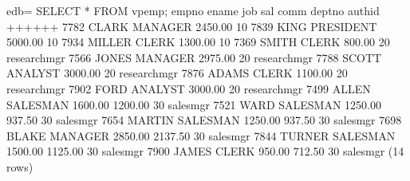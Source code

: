 \documentclass[letterpaper,10pt,english,openany,oneside]{sphinxmanual}
\begin{document}
%
\begin{sphinxVerbatim}[commandchars=\\\{\}]
edb=\PYGZgt{} SELECT * FROM vpemp;
 empno \textbar{} ename  \textbar{}    job    \textbar{}   sal   \textbar{}  comm   \textbar{} deptno \textbar{}   authid
\PYGZhy{}\PYGZhy{}\PYGZhy{}\PYGZhy{}\PYGZhy{}\PYGZhy{}\PYGZhy{}+\PYGZhy{}\PYGZhy{}\PYGZhy{}\PYGZhy{}\PYGZhy{}\PYGZhy{}\PYGZhy{}\PYGZhy{}+\PYGZhy{}\PYGZhy{}\PYGZhy{}\PYGZhy{}\PYGZhy{}\PYGZhy{}\PYGZhy{}\PYGZhy{}\PYGZhy{}\PYGZhy{}\PYGZhy{}+\PYGZhy{}\PYGZhy{}\PYGZhy{}\PYGZhy{}\PYGZhy{}\PYGZhy{}\PYGZhy{}\PYGZhy{}\PYGZhy{}+\PYGZhy{}\PYGZhy{}\PYGZhy{}\PYGZhy{}\PYGZhy{}\PYGZhy{}\PYGZhy{}\PYGZhy{}\PYGZhy{}+\PYGZhy{}\PYGZhy{}\PYGZhy{}\PYGZhy{}\PYGZhy{}\PYGZhy{}\PYGZhy{}\PYGZhy{}+\PYGZhy{}\PYGZhy{}\PYGZhy{}\PYGZhy{}\PYGZhy{}\PYGZhy{}\PYGZhy{}\PYGZhy{}\PYGZhy{}\PYGZhy{}\PYGZhy{}\PYGZhy{}\PYGZhy{}
  7782 \textbar{} CLARK  \textbar{} MANAGER   \textbar{} 2450.00 \textbar{}         \textbar{}     10 \textbar{}
  7839 \textbar{} KING   \textbar{} PRESIDENT \textbar{} 5000.00 \textbar{}         \textbar{}     10 \textbar{}
  7934 \textbar{} MILLER \textbar{} CLERK     \textbar{} 1300.00 \textbar{}         \textbar{}     10 \textbar{}
  7369 \textbar{} SMITH  \textbar{} CLERK     \textbar{}  800.00 \textbar{}         \textbar{}     20 \textbar{} researchmgr
  7566 \textbar{} JONES  \textbar{} MANAGER   \textbar{} 2975.00 \textbar{}         \textbar{}     20 \textbar{} researchmgr
  7788 \textbar{} SCOTT  \textbar{} ANALYST   \textbar{} 3000.00 \textbar{}         \textbar{}     20 \textbar{} researchmgr
  7876 \textbar{} ADAMS  \textbar{} CLERK     \textbar{} 1100.00 \textbar{}         \textbar{}     20 \textbar{} researchmgr
  7902 \textbar{} FORD   \textbar{} ANALYST   \textbar{} 3000.00 \textbar{}         \textbar{}     20 \textbar{} researchmgr
  7499 \textbar{} ALLEN  \textbar{} SALESMAN  \textbar{} 1600.00 \textbar{} 1200.00 \textbar{}     30 \textbar{} salesmgr
  7521 \textbar{} WARD   \textbar{} SALESMAN  \textbar{} 1250.00 \textbar{}  937.50 \textbar{}     30 \textbar{} salesmgr
  7654 \textbar{} MARTIN \textbar{} SALESMAN  \textbar{} 1250.00 \textbar{}  937.50 \textbar{}     30 \textbar{} salesmgr
  7698 \textbar{} BLAKE  \textbar{} MANAGER   \textbar{} 2850.00 \textbar{} 2137.50 \textbar{}     30 \textbar{} salesmgr
  7844 \textbar{} TURNER \textbar{} SALESMAN  \textbar{} 1500.00 \textbar{} 1125.00 \textbar{}     30 \textbar{} salesmgr
  7900 \textbar{} JAMES  \textbar{} CLERK     \textbar{}  950.00 \textbar{}  712.50 \textbar{}     30 \textbar{} salesmgr
(14 rows)
\end{sphinxVerbatim}
\end{document}
